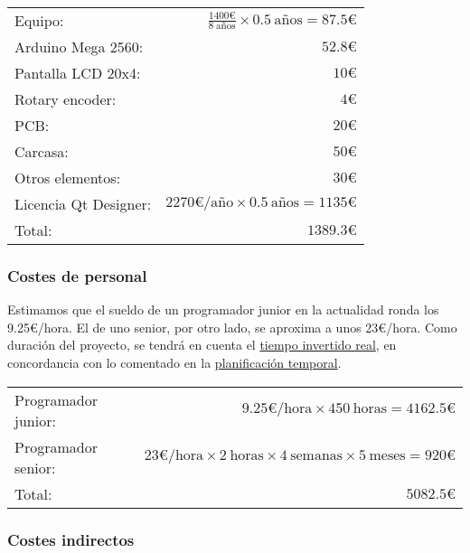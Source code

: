 \begingroup
    \renewcommand{\arraystretch}{1.2}
    \begin{center}
        \begin{tabular}{lr}
            Equipo: & $ \frac{1400\text{€}}{8\ \text{años}} \times 0.5\ \text{años} = 87.5\text{€} $ \\
            Arduino Mega 2560: & $ 52.8\text{€} $ \\
            Pantalla LCD 20x4: & $ 10\text{€} $ \\
            Rotary encoder: & $ 4\text{€} $ \\
            PCB: & $ 20\text{€} $ \\
            Carcasa: & $ 50\text{€} $ \\
            Otros elementos: & $ 30\text{€} $ \\
            Licencia Qt Designer: & $ 2270\text{€/año} \times 0.5\ \text{años} = 1135\text{€} $ \\
            \hline
            Total: & $ 1389.3\text{€} $
        \end{tabular}
    \end{center}
\endgroup

\subsubsection{Costes de personal}

Estimamos que el sueldo de un programador junior en la actualidad ronda los 9.25€/hora. El de uno senior, por otro lado, se aproxima a unos 23€/hora. Como duración del proyecto, se tendrá en cuenta el \hyperref[sec:tiempo_real]{tiempo invertido real}, en concordancia con lo comentado en la \hyperref[ch:planificacion]{planificación temporal}.

\begingroup
    \renewcommand{\arraystretch}{1.2}
    \begin{center}
        \begin{tabular}{lr}
            Programador junior: & $ 9.25\text{€/hora} \times 450\ \text{horas} = 4162.5\text{€} $ \\
            Programador senior: & $ 23\text{€/hora} \times 2\ \text{horas} \times 4\ \text{semanas} \times 5\ \text{meses} = 920\text{€} $ \\
            \hline
            Total: & $ 5082.5\text{€} $
        \end{tabular}
    \end{center}
\endgroup

\subsubsection{Costes indirectos}

